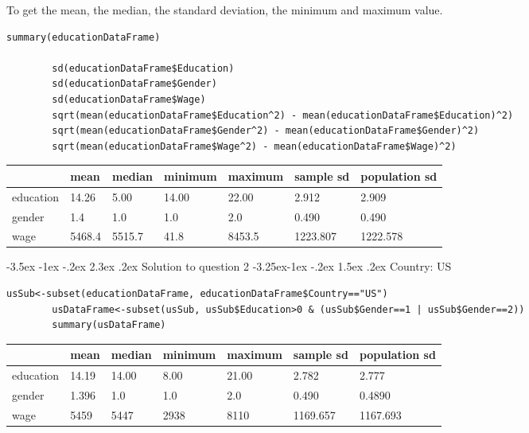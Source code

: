 \documentclass[12pt]{article}
\makeatletter
\renewcommand\section{\@startsection {section}{1}{\z@}%
	{-3.5ex \@plus -1ex \@minus -.2ex}%
	{2.3ex \@plus.2ex}%
	{\normalfont\large\bfseries}}%
\renewcommand\subsection{\@startsection{subsection}{2}{\z@}%
	{-3.25ex\@plus -1ex \@minus -.2ex}%
	{1.5ex \@plus .2ex}%
	{\normalfont\large\bfseries}}%
\makeatother
\begin{document}
	To get the mean, the median, the standard deviation, the minimum and maximum value.
	\begin{lstlisting}[breaklines=true]
		summary(educationDataFrame)
		
		sd(educationDataFrame$Education)
		sd(educationDataFrame$Gender)
		sd(educationDataFrame$Wage)
		sqrt(mean(educationDataFrame$Education^2) - mean(educationDataFrame$Education)^2)
		sqrt(mean(educationDataFrame$Gender^2) - mean(educationDataFrame$Gender)^2)
		sqrt(mean(educationDataFrame$Wage^2) - mean(educationDataFrame$Wage)^2)
	\end{lstlisting}
	\begin{table}[htbp]
		\centering
		\label{my-label}
		\begin{tabular}{l|l|l|l|l|l|l}
			\hline
			          & mean   & median & minimum & maximum & sample sd & population sd \\
			\hline
			education & 14.26  & 5.00   & 14.00   & 22.00   & 2.912     & 2.909\\
			\hline
			gender    & 1.4    & 1.0    & 1.0     & 2.0     & 0.490     & 0.490\\
			\hline
			wage      & 5468.4 & 5515.7 & 41.8    & 8453.5  & 1223.807  & 1222.578\\
			\hline
		\end{tabular}
	\end{table}
	
	\section{Solution to question 2}
	\subsection{Country: US}
	\begin{lstlisting}[breaklines=true]
		usSub<-subset(educationDataFrame, educationDataFrame$Country=="US")
		usDataFrame<-subset(usSub, usSub$Education>0 & (usSub$Gender==1 | usSub$Gender==2))
		summary(usDataFrame)
	\end{lstlisting}
		\begin{table}[htbp]
		\centering
		\label{my-label}
		\begin{tabular}{l|l|l|l|l|l|l}
			\hline
			          & mean   & median & minimum & maximum & sample sd & population sd \\
			\hline
			education & 14.19  & 14.00   & 8.00    & 21.00   & 2.782     & 2.777\\
			\hline
			gender    & 1.396  & 1.0    & 1.0     & 2.0     & 0.490     & 0.4890\\
			\hline
			wage      & 5459   & 5447   & 2938    & 8110    & 1169.657  & 1167.693\\
			\hline
		\end{tabular}
	\end{table}
\end{document}
